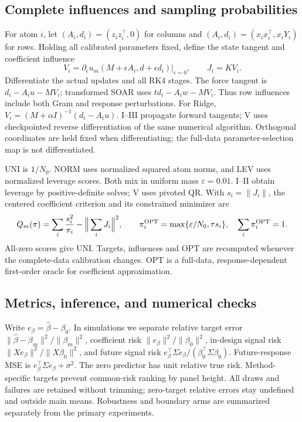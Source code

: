 \documentclass[11pt,a4paper,leqno]{article}
\numberwithin{equation}{section}
\numberwithin{figure}{section}
\numberwithin{table}{section}
\theoremstyle{plain}
\theoremstyle{definition}
\theoremstyle{remark}
\begin{document}
\subsection{Complete influences and sampling probabilities}
For atom $i$, let $(A_i,d_i)=(z_i z_i^\top,0)$ for columns and
$(A_i,d_i)=(x_ix_i^\top,x_iY_i)$ for rows. Holding all calibrated
parameters fixed, define the state tangent and coefficient influence
\[
 V_i=\left.\partial_\epsilon u_m(M+\epsilon A_i,d+\epsilon d_i)
        \right|_{\epsilon=0},\qquad J_i=K V_i.
\]
Differentiate the actual updates and all RK4 stages. The force tangent
is $d_i-A_i u-MV_i$; transformed SOAR uses $td_i-A_iw-MV_i$.
Thus row influences include both Gram and response perturbations.
For Ridge, $V_i=(M+\alpha I)^{-1}(d_i-A_i u)$.
I--III propagate forward tangents; V uses checkpointed reverse
differentiation of the same numerical algorithm. Orthogonal coordinates
are held fixed when differentiating; the full-data parameter-selection map
is not differentiated.

UNI is $1/N_0 $. NORM uses normalized squared atom norms, and LEV uses
normalized leverage scores. Both mix in uniform mass $\varepsilon=0.01$.
I--II obtain leverage by positive-definite solves; V uses pivoted QR.
With $s_i=\|J_i\|$, the centered coefficient criterion and its constrained
minimizer are
\[
 Q_m(\pi)=\sum_i\frac{s_i^2}{\pi_i}-\Big\|\sum_iJ_i\Big\|^2,
 \qquad \pi_i^{\rm OPT}=\max\{\varepsilon/N_0 ,\tau s_i\},
 \quad\sum_i\pi_i^{\rm OPT}=1.
\]
All-zero scores give UNI. Targets, influences and OPT are recomputed
whenever the complete-data calibration changes. OPT is a full-data,
response-dependent first-order oracle for coefficient approximation.

\subsection{Metrics, inference, and numerical checks}
Write $e_\beta=\widehat\beta-\beta_0$. In simulations we separate relative
target error $\|\widehat\beta-\beta_m\|^2/\|\beta_m\|^2$, coefficient risk
$\|e_\beta\|^2/\|\beta_0\|^2$, in-design signal risk
$\|Xe_\beta\|^2/\|X\beta_0\|^2$, and future signal risk
$e_\beta^\top\Sigma e_\beta/(\beta_0^\top\Sigma\beta_0)$.
Future-response MSE is $e_\beta^\top\Sigma e_\beta+\sigma^2$.
The zero predictor has unit relative true risk. Method-specific targets
prevent common-risk ranking by panel height. All draws and failures are
retained without trimming; zero-target relative errors stay undefined and
outside main means. Robustness and boundary arms are summarized separately
from the primary experiments.
\end{document}
